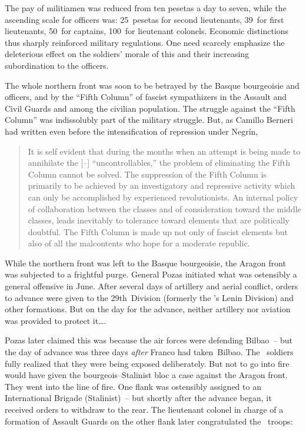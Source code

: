 The pay of militiamen was reduced from ten pesetas a day to seven, while the ascending scale for officers was: 25~pesetas for second lieutenants\kn, 39~for first lieutenants\kn, 50~for captains\kn, 100~for lieutenant colonels. Economic distinctions thus sharply reinforced military regulations. One need scarcely emphasize the deleterious effect on the soldiers’ morale of this and their increasing subordination to the officers.

The whole northern front was soon to be betrayed by the Basque bourgeoisie and officers, and by the ``Fifth Column'' of fascist sympathizers in the Assault and Civil Guards and among the civilian population. The struggle against the ``Fifth Column'' was indissolubly part of the military struggle. But, as Camillo Berneri had written even before the intensification of repression under Negr\'in,

\begin{quotation}
  It is self evident that during the months when an attempt is being made to annihilate the [\POUM--\CNT] “uncontrollables,\kn\kn” the problem of eliminating the Fifth Column cannot be solved. The suppression of the Fifth Column is primarily to be achiev\-ed by an investigatory and repressive activity which can only be accomplished by experienced revolutionists. An internal policy of collaboration between the classes and of consideration toward the middle classes, leads inevitably to tolerance toward elements that are politically doubtful. The Fifth Column is made up not only of fascist elements but also of all the malcontents who hope for a moderate republic.
\end{quotation}

While the northern front was left to the Basque bourgeoisie, the Aragon front was subjected to a frightful purge. General Pozas initiated what was ostensibly a general offensive in June. After several days of artillery and aerial conflict, orders to advance were given to the 29th~Division (formerly the \POUM’s Lenin Division) and other formations. But on the day for the advance, neither artillery nor aviation was provided to protect it\dots.

\indexSPozas{}\indexPOUM{}
Pozas later claimed this was because the air forces were defending Bilbao~-- but the day of advance was three days \emph{after} Franco had taken~Bilbao. The \POUM\ soldiers fully realized that they were being exposed deliberately. But not to go into fire would have given the bourgeois--Stalinist bloc a case against the Aragon front. They went into the line of fire. One flank was ostensibly assigned to an International Brigade (Stalinist)~-- but shortly after the advance began, it received orders to withdraw to the rear. The lieutenant colonel in charge of a formation of Assault Guards on the other flank later congratulated the \POUM\ troops: 

